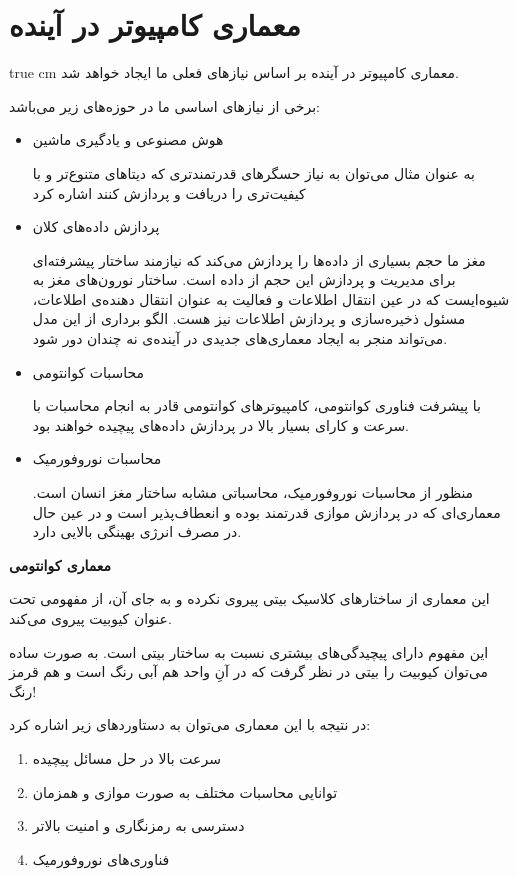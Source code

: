 \documentclass[11pt, twoside]{imsproc}
\begin{document}
\section{معماری کامپیوتر در آینده}
 true cm
معماری کامپیوتر در آینده بر اساس نیاز‌های فعلی ما ایجاد خواهد شد.

برخی از نیاز‌های اساسی ما در حوزه‌های زیر می‌باشد:
\begin{itemize}
\item هوش مصنوعی و یادگیری ماشین

به عنوان مثال می‌توان به نیاز حسگر‌های قدرتمندتری که دیتا‌های متنوع‌تر و با کیفیت‌تری را دریافت و پردازش کنند اشاره کرد

\item پردازش داده‌های کلان

مغز ما حجم بسیاری از داده‌ها را پردازش می‌کند که نیازمند ساختار پیشرفته‌ای برای مدیریت و پردازش این حجم از داده است. ساختار نورون‌های مغز به شیوه‌ایست که در عین انتقال اطلاعات و فعالیت به عنوان انتقال دهنده‌ی اطلاعات، مسئول ذخیره‌سازی و پردازش اطلاعات نیز هست. الگو برداری از این مدل می‌تواند منجر به ایجاد معماری‌های جدیدی در آینده‌ی نه چندان دور شود.

\item محاسبات کوانتومی

با پیشرفت فناوری کوانتومی، کامپیوترهای کوانتومی قادر به انجام محاسبات با سرعت و کارای بسیار بالا در پردازش داده‌های پیچیده خواهند بود.

\item محاسبات نوروفورمیک

منظور از محاسبات نوروفورمیک، محاسباتی مشابه ساختار مغز انسان است. معماری‌ای که در پردازش موازی قدرتمند بوده و انعطاف‌پذیر است و در عین حال در مصرف انرژی بهینگی بالایی دارد.
\end{itemize}

\textbf{معماری کوانتومی}

این معماری از ساختار‌های کلاسیک بیتی پیروی نکرده و به جای آن، از مفهومی تحت عنوان کیوبیت پیروی می‌کند.

این مفهوم دارای پیچیدگی‌های بیشتری نسبت به ساختار بیتی است. به صورت ساده‌ می‌توان کیوبیت را بیتی در نظر گرفت که در آنِ واحد هم آبی رنگ است و هم قرمز رنگ!

در نتیجه با این معماری می‌توان به دستاورد‌های زیر اشاره کرد:
\begin{enumerate}
\item
سرعت بالا در حل مسائل پیچیده
\item 
توانایی محاسبات مختلف به صورت موازی و همزمان
\item 
دسترسی به رمزنگاری و امنیت بالاتر
\item 
فناوری‌های نوروفورمیک
\end{enumerate}
\end{document}

